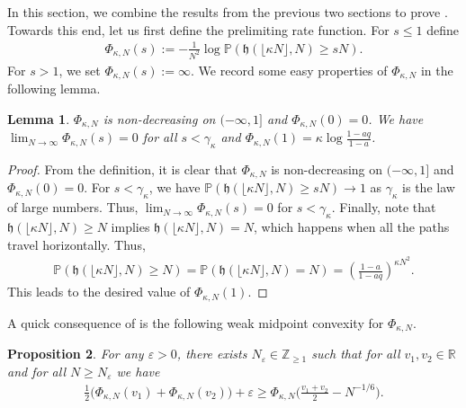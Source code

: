 \documentclass[reqno,11pt]{amsart}
\newcommand{\e}{\varepsilon}
\newcommand{\h}{\mathfrak{h}}
\renewcommand{\Pr}{\mathbb{P}}
\newcommand{\lln}{\gamma_\kappa}
\numberwithin{equation}{section}
\newtheorem{proposition}{Proposition}[section]
\newtheorem{lemma}[proposition]{Lemma}
\theoremstyle{definition}
\newcommand{\R}{\mathbb{R}}
\newcommand{\Z}{\mathbb{Z}}
\begin{document}
In this section, we combine the results from the previous two sections to prove . Towards this end, let us first define the prelimiting rate function. For $s \le 1$ define
\begin{align}\label{def:tta}
\Phi_{\kappa,N}(s):=-\frac1{N^2}\log\Pr(\h(\lfloor\kappa N\rfloor,N) \ge sN).
\end{align}
For $s>1$, we set $\Phi_{\kappa,N}(s):=\infty$. We record some easy properties of $\Phi_{\kappa,N}$ in the following lemma.
\begin{lemma}\label{l.tprop} $\Phi_{\kappa,N}$ is non-decreasing on $(-\infty,1]$ and $\Phi_{\kappa,N}(0)=0$. We have $\lim_{N\to\infty}\Phi_{\kappa,N}(s)=0$ for all $s<\lln$ and $\Phi_{\kappa,N}(1)=\kappa \log \frac{1-aq}{1-a}$.
\end{lemma}
\begin{proof} From the definition, it is clear that $\Phi_{\kappa,N}$ is non-decreasing on $(-\infty,1]$ and $\Phi_{\kappa,N}(0)=0$. For $s<\lln$, we have $\Pr(\h(\lfloor\kappa N\rfloor,N) \ge sN) \to 1$ as $\lln$ is the law of large numbers. Thus,  $\lim_{N\to\infty}\Phi_{\kappa,N}(s)=0$ for $s<\lln$. Finally, note that $\h(\lfloor\kappa N\rfloor,N)\ge N$ implies $\h(\lfloor\kappa N\rfloor,N)=N$, which happens when all the paths travel horizontally. Thus, 
    \begin{align*}
        \Pr(\h(\lfloor\kappa N\rfloor,N) \ge N)=\Pr(\h(\lfloor\kappa N\rfloor,N) =N)= \left(\frac{1-a}{1-aq}\right)^{\kappa N^2}.
    \end{align*}
    This leads to the desired value of $\Phi_{\kappa,N}(1)$.
\end{proof}

A quick consequence of  is the following weak midpoint convexity for $\Phi_{\kappa,N}$. 
\begin{proposition}
\label{cor:tconvex} For any $\e>0$, there exists $N_{\e} \in \Z_{\ge 1}$ such that for all $v_1,v_2\in \R$ and for all  $N\ge N_\e$ we have
\begin{align*}
\frac12\big(\Phi_{\kappa,N}(v_1)+\Phi_{\kappa,N}(v_2)\big)+\e \ge \Phi_{\kappa,N}\bigg(\frac{v_1+v_2}{2}-N^{-1/6}\bigg).
\end{align*}
\end{proposition}
\end{document}
